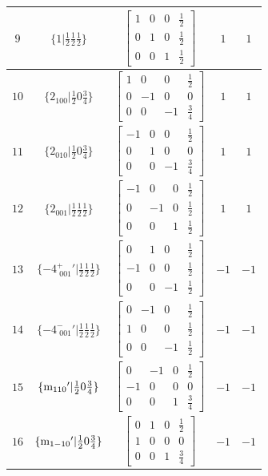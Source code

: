 \documentclass[fleqn,8pt]{jsarticle}
\begin{document}
\begin{longtable}{ccccc}
$ 9 $ & $ \{1|\frac{1}{2} \frac{1}{2} \frac{1}{2}\} $ & $ \begin{bmatrix} 1 & 0 & 0 & \frac{1}{2} \\ 0 & 1 & 0 & \frac{1}{2} \\ 0 & 0 & 1 & \frac{1}{2} \end{bmatrix} $ & $ 1 $ & $ 1 $ \\ \hline
$ 10 $ & $ \{2{}_{100}|\frac{1}{2} 0 \frac{3}{4}\} $ & $ \begin{bmatrix} 1 & 0 & 0 & \frac{1}{2} \\ 0 & -1 & 0 & 0 \\ 0 & 0 & -1 & \frac{3}{4} \end{bmatrix} $ & $ 1 $ & $ 1 $ \\ \hline
$ 11 $ & $ \{2{}_{010}|\frac{1}{2} 0 \frac{3}{4}\} $ & $ \begin{bmatrix} -1 & 0 & 0 & \frac{1}{2} \\ 0 & 1 & 0 & 0 \\ 0 & 0 & -1 & \frac{3}{4} \end{bmatrix} $ & $ 1 $ & $ 1 $ \\ \hline
$ 12 $ & $ \{2{}_{001}|\frac{1}{2} \frac{1}{2} \frac{1}{2}\} $ & $ \begin{bmatrix} -1 & 0 & 0 & \frac{1}{2} \\ 0 & -1 & 0 & \frac{1}{2} \\ 0 & 0 & 1 & \frac{1}{2} \end{bmatrix} $ & $ 1 $ & $ 1 $ \\ \hline
$ 13 $ & $ \{-4^{+}_{\,\,001}{}'|\frac{1}{2} \frac{1}{2} \frac{1}{2}\} $ & $ \begin{bmatrix} 0 & 1 & 0 & \frac{1}{2} \\ -1 & 0 & 0 & \frac{1}{2} \\ 0 & 0 & -1 & \frac{1}{2} \end{bmatrix} $ & $ -1 $ & $ -1 $ \\ \hline
$ 14 $ & $ \{-4^{-}_{\,\,001}{}'|\frac{1}{2} \frac{1}{2} \frac{1}{2}\} $ & $ \begin{bmatrix} 0 & -1 & 0 & \frac{1}{2} \\ 1 & 0 & 0 & \frac{1}{2} \\ 0 & 0 & -1 & \frac{1}{2} \end{bmatrix} $ & $ -1 $ & $ -1 $ \\ \hline
$ 15 $ & $ \{{\rm m}_{110}{}'|\frac{1}{2} 0 \frac{3}{4}\} $ & $ \begin{bmatrix} 0 & -1 & 0 & \frac{1}{2} \\ -1 & 0 & 0 & 0 \\ 0 & 0 & 1 & \frac{3}{4} \end{bmatrix} $ & $ -1 $ & $ -1 $ \\ \hline
$ 16 $ & $ \{{\rm m}_{1-10}{}'|\frac{1}{2} 0 \frac{3}{4}\} $ & $ \begin{bmatrix} 0 & 1 & 0 & \frac{1}{2} \\ 1 & 0 & 0 & 0 \\ 0 & 0 & 1 & \frac{3}{4} \end{bmatrix} $ & $ -1 $ & $ -1 $ \\
\end{longtable}
\end{document}
